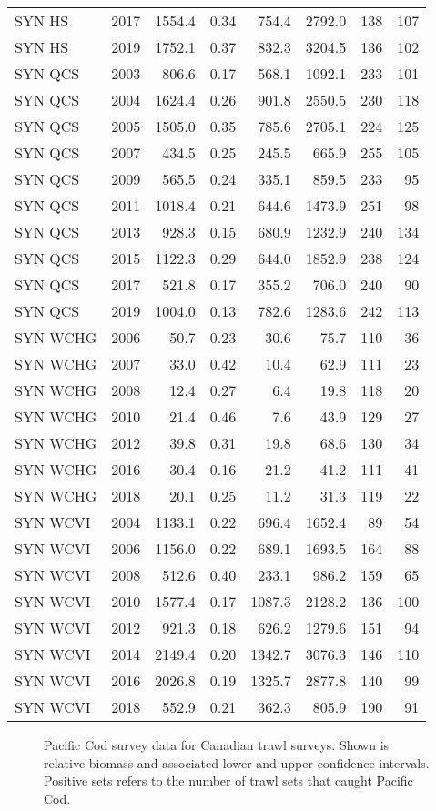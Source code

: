 \documentclass[11pt]{book}
\begin{document}
\begin{longtable}[]{@{}lrrrrrrr@{}}
SYN HS & 2017 & 1554.4 & 0.34 & 754.4 & 2792.0 & 138 & 107\tabularnewline
SYN HS & 2019 & 1752.1 & 0.37 & 832.3 & 3204.5 & 136 & 102\tabularnewline
SYN QCS & 2003 & 806.6 & 0.17 & 568.1 & 1092.1 & 233 & 101\tabularnewline
SYN QCS & 2004 & 1624.4 & 0.26 & 901.8 & 2550.5 & 230 & 118\tabularnewline
SYN QCS & 2005 & 1505.0 & 0.35 & 785.6 & 2705.1 & 224 & 125\tabularnewline
SYN QCS & 2007 & 434.5 & 0.25 & 245.5 & 665.9 & 255 & 105\tabularnewline
SYN QCS & 2009 & 565.5 & 0.24 & 335.1 & 859.5 & 233 & 95\tabularnewline
SYN QCS & 2011 & 1018.4 & 0.21 & 644.6 & 1473.9 & 251 & 98\tabularnewline
SYN QCS & 2013 & 928.3 & 0.15 & 680.9 & 1232.9 & 240 & 134\tabularnewline
SYN QCS & 2015 & 1122.3 & 0.29 & 644.0 & 1852.9 & 238 & 124\tabularnewline
SYN QCS & 2017 & 521.8 & 0.17 & 355.2 & 706.0 & 240 & 90\tabularnewline
SYN QCS & 2019 & 1004.0 & 0.13 & 782.6 & 1283.6 & 242 & 113\tabularnewline
SYN WCHG & 2006 & 50.7 & 0.23 & 30.6 & 75.7 & 110 & 36\tabularnewline
SYN WCHG & 2007 & 33.0 & 0.42 & 10.4 & 62.9 & 111 & 23\tabularnewline
SYN WCHG & 2008 & 12.4 & 0.27 & 6.4 & 19.8 & 118 & 20\tabularnewline
SYN WCHG & 2010 & 21.4 & 0.46 & 7.6 & 43.9 & 129 & 27\tabularnewline
SYN WCHG & 2012 & 39.8 & 0.31 & 19.8 & 68.6 & 130 & 34\tabularnewline
SYN WCHG & 2016 & 30.4 & 0.16 & 21.2 & 41.2 & 111 & 41\tabularnewline
SYN WCHG & 2018 & 20.1 & 0.25 & 11.2 & 31.3 & 119 & 22\tabularnewline
SYN WCVI & 2004 & 1133.1 & 0.22 & 696.4 & 1652.4 & 89 & 54\tabularnewline
SYN WCVI & 2006 & 1156.0 & 0.22 & 689.1 & 1693.5 & 164 & 88\tabularnewline
SYN WCVI & 2008 & 512.6 & 0.40 & 233.1 & 986.2 & 159 & 65\tabularnewline
SYN WCVI & 2010 & 1577.4 & 0.17 & 1087.3 & 2128.2 & 136 & 100\tabularnewline
SYN WCVI & 2012 & 921.3 & 0.18 & 626.2 & 1279.6 & 151 & 94\tabularnewline
SYN WCVI & 2014 & 2149.4 & 0.20 & 1342.7 & 3076.3 & 146 & 110\tabularnewline
SYN WCVI & 2016 & 2026.8 & 0.19 & 1325.7 & 2877.8 & 140 & 99\tabularnewline
SYN WCVI & 2018 & 552.9 & 0.21 & 362.3 & 805.9 & 190 & 91\tabularnewline
\bottomrule
\end{longtable}
\begin{figure}[htb]

{\centering {} 

}

\caption{Pacific Cod survey data for Canadian trawl surveys. Shown is relative biomass and associated lower and upper confidence intervals. Positive sets refers to the number of trawl sets that caught Pacific Cod.}\label{fig:surv-canadian}
\end{figure}
\clearpage
\end{document}
